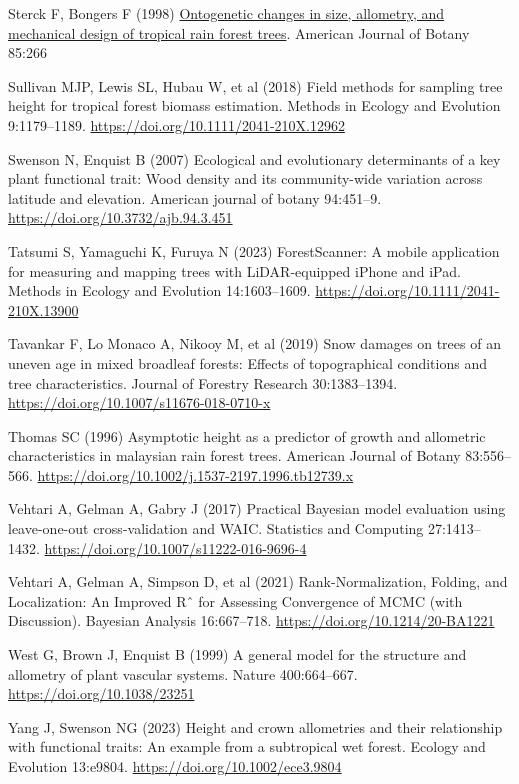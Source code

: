 \documentclass[
  12pt,
  letterpaper,
  DIV=11,
  numbers=noendperiod]{scrartcl}
\newlength{\cslhangindent}
\newlength{\cslentryspacingunit} %
\newenvironment{CSLReferences}[2] %
 {%
  \setlength{\parindent}{0pt}
  \ifodd #1
  \let\oldpar\par
  \def\par{\hangindent=\cslhangindent\oldpar}
  \fi
  \setlength{\parskip}{#2\cslentryspacingunit}
 }%
 {}
\begin{document}
\begin{CSLReferences}{1}{0}
\leavevmode{}%
Sterck F, Bongers F (1998)
\href{https://www.ncbi.nlm.nih.gov/pubmed/21684910}{Ontogenetic changes
in size, allometry, and mechanical design of tropical rain forest
trees}. American Journal of Botany 85:266

\leavevmode{}%
Sullivan MJP, Lewis SL, Hubau W, et al (2018) Field methods for sampling
tree height for tropical forest biomass estimation. Methods in Ecology
and Evolution 9:1179--1189.
\url{https://doi.org/10.1111/2041-210X.12962}

\leavevmode{}%
Swenson N, Enquist B (2007) Ecological and evolutionary determinants of
a key plant functional trait: {Wood} density and its community-wide
variation across latitude and elevation. American journal of botany
94:451--9. \url{https://doi.org/10.3732/ajb.94.3.451}

\leavevmode{}%
Tatsumi S, Yamaguchi K, Furuya N (2023) {ForestScanner}: {A} mobile
application for measuring and mapping trees with {LiDAR}-equipped
{iPhone} and {iPad}. Methods in Ecology and Evolution 14:1603--1609.
\url{https://doi.org/10.1111/2041-210X.13900}

\leavevmode{}%
Tavankar F, Lo Monaco A, Nikooy M, et al (2019) Snow damages on trees of
an uneven age in mixed broadleaf forests: Effects of topographical
conditions and tree characteristics. Journal of Forestry Research
30:1383--1394. \url{https://doi.org/10.1007/s11676-018-0710-x}

\leavevmode{}%
Thomas SC (1996) Asymptotic height as a predictor of growth and
allometric characteristics in malaysian rain forest trees. American
Journal of Botany 83:556--566.
\url{https://doi.org/10.1002/j.1537-2197.1996.tb12739.x}

\leavevmode{}%
Vehtari A, Gelman A, Gabry J (2017) Practical {Bayesian} model
evaluation using leave-one-out cross-validation and {WAIC}. Statistics
and Computing 27:1413--1432.
\url{https://doi.org/10.1007/s11222-016-9696-4}

\leavevmode{}%
Vehtari A, Gelman A, Simpson D, et al (2021) Rank-{Normalization},
{Folding}, and {Localization}: {An} {Improved} {Rˆ} for {Assessing}
{Convergence} of {MCMC} (with {Discussion}). Bayesian Analysis
16:667--718. \url{https://doi.org/10.1214/20-BA1221}

\leavevmode{}%
West G, Brown J, Enquist B (1999) A general model for the structure and
allometry of plant vascular systems. Nature 400:664--667.
\url{https://doi.org/10.1038/23251}

\leavevmode{}%
Yang J, Swenson NG (2023) Height and crown allometries and their
relationship with functional traits: {An} example from a subtropical wet
forest. Ecology and Evolution 13:e9804.
\url{https://doi.org/10.1002/ece3.9804}

\end{CSLReferences}
\end{document}
